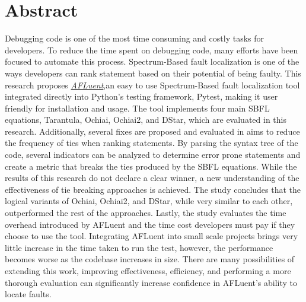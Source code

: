 \chapter*{Abstract}

Debugging code is one of the most time consuming and costly tasks for
developers. To reduce the time spent on debugging code, many efforts have been
focused to automate this process. Spectrum-Based fault localization is one of
the ways developers can rank statement based on their potential of being faulty.
This research proposes \href{https://github.com/noorbuchi/AFLuent}{\emph{AFLuent}}\cite{afluent},an easy to use Spectrum-Based
fault localization tool integrated directly into Python's testing framework,
Pytest, making it user friendly for installation and usage. The
tool implements four main SBFL equations, Tarantula, Ochiai, Ochiai2, and DStar,
which are evaluated in this research. Additionally, several fixes are
proposed and evaluated in aims to reduce the frequency of ties when ranking
statements. By parsing the syntax tree of the code, several indicators can be
analyzed to determine error prone statements and create a metric that breaks
the ties produced by the SBFL equations. While the results of this research do
not declare a clear winner, a new understanding of the effectiveness of
tie breaking approaches is achieved. The study concludes that the logical
variants of Ochiai, Ochiai2, and DStar, while very similar to each other,
outperformed the rest of the approaches. Lastly, the study evaluates the time
overhead introduced by AFLuent and the time cost developers must pay if they choose
to use the tool. Integrating AFLuent into small scale projects brings very
little increase in the time taken to run the test, however, the performance
becomes worse as the codebase increases in size. There are many possibilities of extending
this work, improving effectiveness, efficiency, and performing
a more thorough evaluation can significantly increase confidence in AFLuent's
ability to locate faults.
